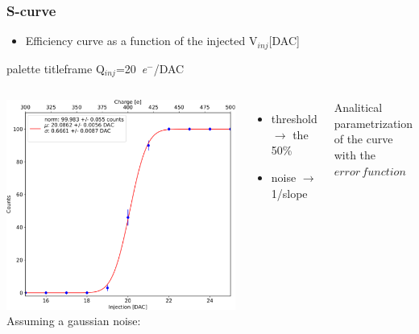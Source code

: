     \begin{frame}
        \frametitle{S-curve}
        \begin{itemize}
            \item Efficiency curve as a function of the injected V$_{inj}$[DAC]
        \end{itemize}
        \begin{beamercolorbox}[ rounded=true, center]{palette titleframe}
            Q$_{inj}$=\SI{20}{\elementarycharge}$^-$/DAC
        \end{beamercolorbox}
        \medskip
        \begin{columns}
                \includegraphics[width=1.1\linewidth]{figures/charaterization/scurve.pdf}
                Assuming a gaussian noise:
                \begin{itemize}
                    \item threshold $\rightarrow$ the 50\%
                    \item noise $\rightarrow$ 1/slope 
                \end{itemize}
                \medskip
                Analitical parametrization of the curve with the $error\,function$\\
                
   
        \end{columns} 
    \end{frame}



